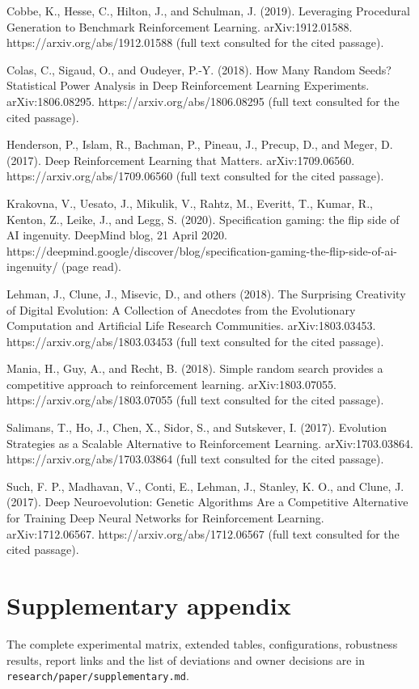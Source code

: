 \documentclass[
]{article}
\begin{document}
Cobbe, K., Hesse, C., Hilton, J., and Schulman, J. (2019). Leveraging
Procedural Generation to Benchmark Reinforcement Learning.
arXiv:1912.01588. https://arxiv.org/abs/1912.01588 (full text consulted
for the cited passage).

Colas, C., Sigaud, O., and Oudeyer, P.-Y. (2018). How Many Random Seeds?
Statistical Power Analysis in Deep Reinforcement Learning Experiments.
arXiv:1806.08295. https://arxiv.org/abs/1806.08295 (full text consulted
for the cited passage).

Henderson, P., Islam, R., Bachman, P., Pineau, J., Precup, D., and
Meger, D. (2017). Deep Reinforcement Learning that Matters.
arXiv:1709.06560. https://arxiv.org/abs/1709.06560 (full text consulted
for the cited passage).

Krakovna, V., Uesato, J., Mikulik, V., Rahtz, M., Everitt, T., Kumar,
R., Kenton, Z., Leike, J., and Legg, S. (2020). Specification gaming:
the flip side of AI ingenuity. DeepMind blog, 21 April 2020.
https://deepmind.google/discover/blog/specification-gaming-the-flip-side-of-ai-ingenuity/
(page read).

Lehman, J., Clune, J., Misevic, D., and others (2018). The Surprising
Creativity of Digital Evolution: A Collection of Anecdotes from the
Evolutionary Computation and Artificial Life Research Communities.
arXiv:1803.03453. https://arxiv.org/abs/1803.03453 (full text consulted
for the cited passage).

Mania, H., Guy, A., and Recht, B. (2018). Simple random search provides
a competitive approach to reinforcement learning. arXiv:1803.07055.
https://arxiv.org/abs/1803.07055 (full text consulted for the cited
passage).

Salimans, T., Ho, J., Chen, X., Sidor, S., and Sutskever, I. (2017).
Evolution Strategies as a Scalable Alternative to Reinforcement
Learning. arXiv:1703.03864. https://arxiv.org/abs/1703.03864 (full text
consulted for the cited passage).

Such, F. P., Madhavan, V., Conti, E., Lehman, J., Stanley, K. O., and
Clune, J. (2017). Deep Neuroevolution: Genetic Algorithms Are a
Competitive Alternative for Training Deep Neural Networks for
Reinforcement Learning. arXiv:1712.06567.
https://arxiv.org/abs/1712.06567 (full text consulted for the cited
passage).

\section{Supplementary appendix}\label{supplementary-appendix}

The complete experimental matrix, extended tables, configurations,
robustness results, report links and the list of deviations and owner
decisions are in \texttt{research/paper/supplementary.md}.
\end{document}
